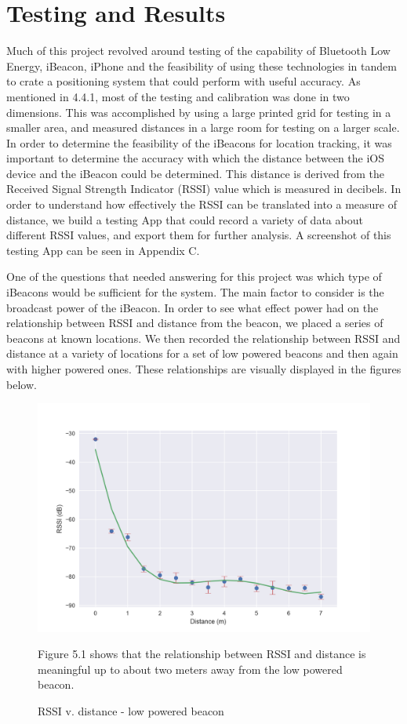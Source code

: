 \chapter{Testing and Results}
Much of this project revolved around testing of the capability of Bluetooth Low Energy, iBeacon, iPhone and the feasibility of using these technologies in tandem to crate a positioning system that could perform with useful accuracy.  As mentioned in 4.4.1, most of the testing and calibration was done in two dimensions.  This was accomplished by using a large printed grid for testing in a smaller area, and measured distances in a large room for testing on a larger scale.  In order to determine the feasibility of the iBeacons for location tracking, it was important to determine the accuracy with which the distance between the iOS device and the iBeacon could be determined.  This distance is derived from the Received Signal Strength Indicator (RSSI) value which is measured in decibels.  In order to understand how effectively the RSSI can be translated into a measure of distance, we build a testing App that could record a variety of data about different RSSI values, and export them for further analysis.  A screenshot of this testing App can be seen in Appendix C.

One of the questions that needed answering for this project was which type of iBeacons would be sufficient for the system.  The main factor to consider is the broadcast power of the iBeacon.  In order to see what effect power had on the relationship between RSSI and distance from the beacon, we placed a series of beacons at known locations.  We then recorded the relationship between RSSI and distance at a variety of locations for a set of low powered beacons and then again with higher powered ones.  These relationships are visually displayed in the figures below.

\begin{figure}[h]
\includegraphics[width=.85\textwidth]{images/Oltica.png}
\caption{RSSI v. distance - low powered beacon}
\vspace{1em}
Figure 5.1 shows that the relationship between RSSI and distance is meaningful up to about two meters away from the low powered beacon.
\end{figure}

